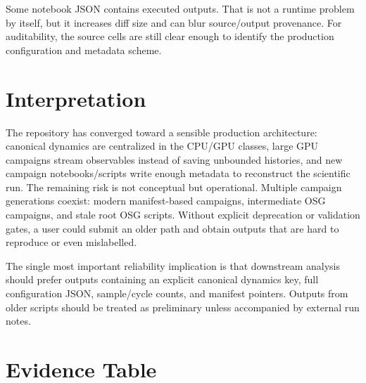 \documentclass[aps,prb,onecolumn,nofootinbib,superscriptaddress]{revtex4-2}
\begin{document}
Some notebook JSON contains executed outputs.  That is not a runtime problem by
itself, but it increases diff size and can blur source/output provenance.  For
auditability, the source cells are still clear enough to identify the production
configuration and metadata scheme.

\section{Interpretation}

The repository has converged toward a sensible production architecture:
canonical dynamics are centralized in the CPU/GPU classes, large GPU campaigns
stream observables instead of saving unbounded histories, and new campaign
notebooks/scripts write enough metadata to reconstruct the scientific run.  The
remaining risk is not conceptual but operational.  Multiple campaign generations
coexist: modern manifest-based campaigns, intermediate OSG campaigns, and stale
root OSG scripts.  Without explicit deprecation or validation gates, a user could
submit an older path and obtain outputs that are hard to reproduce or even
mislabelled.

The single most important reliability implication is that downstream analysis
should prefer outputs containing an explicit canonical dynamics key, full
configuration JSON, sample/cycle counts, and manifest pointers.  Outputs from
older scripts should be treated as preliminary unless accompanied by external
run notes.

\section{Evidence Table}
\end{document}
